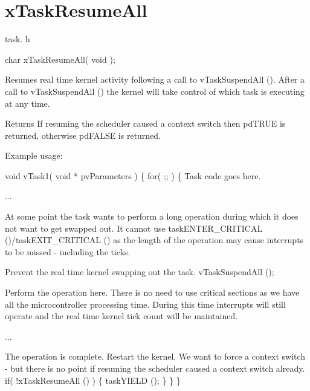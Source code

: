 \hypertarget{group__x_task_resume_all}{\section{x\-Task\-Resume\-All}
\label{group__x_task_resume_all}
}
task. h 
\begin{DoxyPre}char xTaskResumeAll( void );\end{DoxyPre}


Resumes real time kernel activity following a call to v\-Task\-Suspend\-All (). After a call to v\-Task\-Suspend\-All () the kernel will take control of which task is executing at any time.

\begin{DoxyReturn}{Returns}
If resuming the scheduler caused a context switch then pd\-T\-R\-U\-E is returned, otherwise pd\-F\-A\-L\-S\-E is returned.
\end{DoxyReturn}
Example usage\-: 
\begin{DoxyPre}
 void vTask1( void * pvParameters )
 \{
         for( ;; )
         \{
Task code goes here.\end{DoxyPre}



\begin{DoxyPre}...\end{DoxyPre}



\begin{DoxyPre}At some point the task wants to perform a long operation during
which it does not want to get swapped out.  It cannot use
taskENTER\_CRITICAL ()/taskEXIT\_CRITICAL () as the length of the
operation may cause interrupts to be missed - including the
ticks.\end{DoxyPre}



\begin{DoxyPre}Prevent the real time kernel swapping out the task.
                 vTaskSuspendAll ();\end{DoxyPre}



\begin{DoxyPre}Perform the operation here.  There is no need to use critical
sections as we have all the microcontroller processing time.
During this time interrupts will still operate and the real
time kernel tick count will be maintained.\end{DoxyPre}



\begin{DoxyPre}...\end{DoxyPre}



\begin{DoxyPre}The operation is complete.  Restart the kernel.  We want to force
a context switch - but there is no point if resuming the scheduler
caused a context switch already.
                 if( !xTaskResumeAll () )
                 \{
                          taskYIELD ();
                 \}
         \}
 \}
   \end{DoxyPre}
 